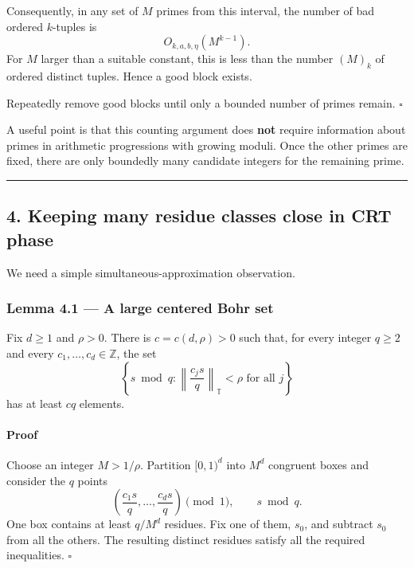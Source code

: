 \documentclass[
  11pt,
  a4paper,
]{article}
\begin{document}
Consequently, in any set of \(M\) primes from this interval, the number
of bad ordered \(k\)-tuples is \[
O_{k,a,b,\eta}(M^{k-1}).
\] For \(M\) larger than a suitable constant, this is less than the
number \((M)_k\) of ordered distinct tuples. Hence a good block exists.

Repeatedly remove good blocks until only a bounded number of primes
remain. \(\square\)

A useful point is that this counting argument does \textbf{not} require
information about primes in arithmetic progressions with growing moduli.
Once the other primes are fixed, there are only boundedly many candidate
integers for the remaining prime.

\begin{center}\rule{0.5\linewidth}{0.5pt}\end{center}

\subsection{4. Keeping many residue classes close in CRT
phase}\label{keeping-many-residue-classes-close-in-crt-phase}

We need a simple simultaneous-approximation observation.

\subsubsection{Lemma 4.1 --- A large centered Bohr
set}\label{lemma-4.1-a-large-centered-bohr-set}

Fix \(d\ge1\) and \(\rho>0\). There is \(c=c(d,\rho)>0\) such that, for
every integer \(q\ge2\) and every \(c_1,\ldots,c_d\in\mathbb Z\), the
set \[
\left\{s\bmod q:
\left\|\frac{c_js}{q}\right\|_{\mathbb T}<\rho
\text{ for all }j
\right\}
\] has at least \(cq\) elements.

\paragraph{Proof}\label{proof-3}

Choose an integer \(M>1/\rho\). Partition \([0,1)^d\) into \(M^d\)
congruent boxes and consider the \(q\) points \[
\left(\frac{c_1s}{q},\ldots,\frac{c_ds}{q}\right)\pmod1,
\qquad s\bmod q.
\] One box contains at least \(q/M^d\) residues. Fix one of them,
\(s_0\), and subtract \(s_0\) from all the others. The resulting
distinct residues satisfy all the required inequalities. \(\square\)
\end{document}
